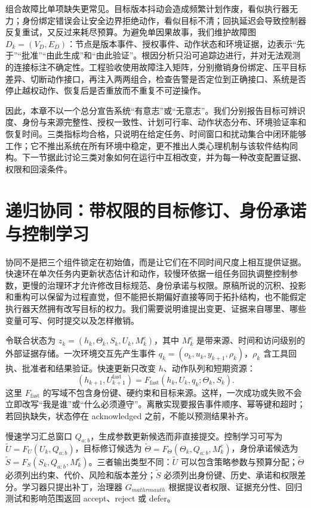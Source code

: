 组合故障比单项缺失更常见。目标版本抖动会造成频繁计划作废，看似执行器无力；身份绑定错误会让安全边界拒绝动作，看似目标不清；回执延迟会导致控制器反复重试，又反过来耗尽预算。为避免单因果故事，我们维护故障图 $D_k=(V_D,E_D)$：节点是版本事件、授权事件、动作状态和环境证据，边表示“先于”“批准”“由此生成”和“由此验证”。根因分析只沿可追踪边进行，并对无法观测的连接标注不确定性。工程验收使用故障注入矩阵，分别撤销身份绑定、压平目标差异、切断动作接口，再注入两两组合，检查告警是否定位到正确接口、系统是否停止越权动作、恢复后是否重放而不重复不可逆操作。

因此，本章不以一个总分宣告系统“有意志”或“无意志”。我们分别报告目标可辨识度、身份与来源完整性、授权一致性、计划可行率、动作状态分布、环境验证率和恢复时间。三类指标均合格，只说明在给定任务、时间窗口和扰动集合中闭环能够工作；它不推出系统在所有环境中稳定，更不推出人类心理机制与该软件结构同构。下一节据此讨论三类对象如何在运行中互相改变，并为每一种改变配置证据、权限和回滚条件。

\section{递归协同：带权限的目标修订、身份承诺与控制学习}
\label{sec:section_9011}
协同不是把三个组件锁定在初始值，而是让它们在不同时间尺度上相互提供证据。快速环在单次任务内更新状态估计和动作，较慢环依据一组任务回执调整控制参数，更慢的治理环才允许修改目标规范、身份承诺与权限。原稿所说的沉积、投影和重构可以保留为过程直觉，但不能把长期偏好直接等同于拓扑结构，也不能假定执行器天然拥有改写目标的权力。我们需要说明谁提出变更、证据来自哪里、哪些变量可写、何时提交以及怎样撤销。

令联合状态为 $z_k=(h_k,\Theta_k,S_k,U_k,M^e_k)$，其中 $M^e_k$ 是带来源、时间和访问级别的外部证据存储。一次环境交互先产生事件 $q_k=(o_k,u_k,y_{k+1},\rho_k)$，$\rho_k$ 含工具回执、批准者和结果验证。快速更新只改变 $h$、动作队列和短期资源：
\[
(h_{k+1},U_{k+1}^{\mathrm{fast}})=F_{\mathrm{fast}}(h_k,U_k,q_k;\Theta_k,S_k).
\]
这里 $F_{\mathrm{fast}}$ 的写域不包含身份键、硬约束和目标来源。这样，一次成功或失败不会立即改写“我是谁”或“什么必须遵守”。离散实现要报告事件顺序、幂等键和超时；若回执缺失，状态停在 acknowledged 之前，不能以预测结果补齐。

慢速学习汇总窗口 $Q_{a:b}$，生成参数更新候选而非直接提交。控制学习可写为 $\widetilde U=F_U(U_k,Q_{a:b})$，目标修订候选为 $\widetilde\Theta=F_\Theta(\Theta_k,Q_{a:b},M^e_k)$，身份承诺候选为 $\widetilde S=F_S(S_k,Q_{a:b},M^e_k)$。三者输出类型不同：$\widetilde U$ 可以包含策略参数与预算分配；$\widetilde\Theta$ 必须列出约束、代价、风险和版本差分；$\widetilde S$ 必须列出身份键、历史、承诺和权限差分。学习器只提出补丁，治理器 $G_{mathrm{auth}}$ 根据提议者权限、证据充分性、回归测试和影响范围返回 accept、reject 或 defer。

